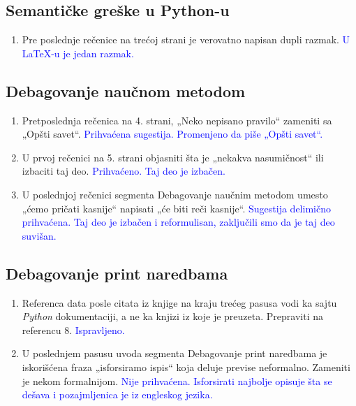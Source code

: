 \documentclass[a4paper]{report}
\newcommand{\odgovor}[1]{\textcolor{blue}{#1}}
\begin{document}
\subsection{Semantičke greške u Python-u}
\begin{enumerate}
    \item Pre poslednje rečenice na trećoj strani je verovatno napisan dupli razmak.
    \odgovor{U LaTeX-u je jedan razmak.}
\end{enumerate}
\subsection{Debagovanje naučnom metodom}
\begin{enumerate}
    \item Pretposlednja rečenica na 4. strani, „Neko nepisano pravilo“ zameniti sa „Opšti savet“.
    \odgovor{Prihvaćena sugestija. Promenjeno da piše „Opšti savet“.}
    \item U prvoj rečenici na 5. strani objasniti šta je „nekakva nasumičnost“ ili izbaciti taj deo.
    \odgovor{Prihvaćeno. Taj deo je izbačen.}
    \item U poslednjoj rečenici segmenta Debagovanje naučnim metodom umesto „ćemo pričati kasnije“ napisati „će biti reči kasnije“.
    \odgovor{Sugestija delimično prihvaćena. Taj deo je izbačen i reformulisan, zaključili smo da je taj deo suvišan.}
\end{enumerate}
\subsection{Debagovanje print naredbama}
\begin{enumerate}
    \item Referenca data posle citata iz knjige na kraju trećeg pasusa vodi ka sajtu \emph{Python} dokumentaciji, a ne ka knjizi iz koje je preuzeta. Prepraviti na referencu 8.
    \odgovor{Ispravljeno.}
    \item U poslednjem pasusu uvoda segmenta Debagovanje print naredbama je iskorišćena fraza „isforsiramo ispis“ koja deluje previse neformalno. Zameniti je nekom formalnijom.
    \odgovor{Nije prihvaćena. Isforsirati najbolje opisuje šta se dešava i pozajmljenica je iz engleskog jezika.}
\end{enumerate}
\end{document}
